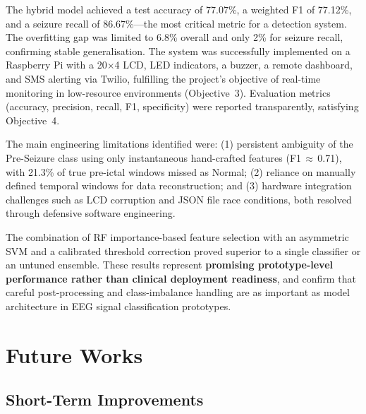 \documentclass[12pt, a4paper]{report}
\begin{document}
The hybrid model achieved a test accuracy of 77.07\%, a weighted F1 of
77.12\%, and a seizure recall of 86.67\%---the most critical metric for a
detection system. The overfitting gap was limited to 6.8\% overall and
only 2\% for seizure recall, confirming stable generalisation. The system
was successfully implemented on a Raspberry Pi with a 20$\times$4 LCD,
LED indicators, a buzzer, a remote dashboard, and SMS alerting via Twilio,
fulfilling the project's objective of real-time monitoring in low-resource
environments (Objective~3). Evaluation metrics (accuracy, precision, recall,
F1, specificity) were reported transparently, satisfying Objective~4.

The main engineering limitations identified were: (1) persistent ambiguity
of the Pre-Seizure class using only instantaneous hand-crafted features
(F1\,$\approx$\,0.71), with 21.3\% of true pre-ictal windows missed as
Normal; (2) reliance on manually defined temporal windows for data
reconstruction; and (3) hardware integration challenges such as LCD
corruption and JSON file race conditions, both resolved through defensive
software engineering.

The combination of RF importance-based feature selection with an asymmetric
SVM and a calibrated threshold correction proved superior to a single
classifier or an untuned ensemble. These results represent
\textbf{promising prototype-level performance rather than clinical
deployment readiness}, and confirm that careful post-processing and
class-imbalance handling are as important as model architecture in EEG
signal classification prototypes.

\chapter{Future Works}

\section{Short-Term Improvements}
\end{document}

